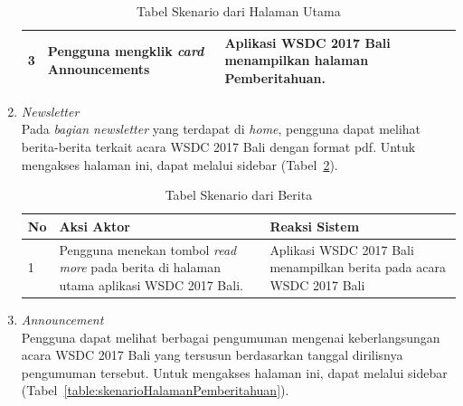 \begin{enumerate}
\begin{table}[H]
\begin{tabular}{|p{0.5cm}|p{7cm}|p{7cm}|}
				3  & Pengguna mengklik {\it card} Announcements & Aplikasi WSDC 2017 Bali menampilkan halaman Pemberitahuan. \\ \hline
			\end{tabular}
			\caption{Tabel Skenario dari Halaman Utama}
			\label{table:skenarioHalamanUtama}
		\end{table}
	\item \textit{Newsletter} \\ 
	Pada \textit{bagian newsletter} yang terdapat di \textit{home}, pengguna dapat melihat berita-berita terkait acara WSDC 2017 Bali dengan format pdf. Untuk mengakses halaman ini, dapat melalui sidebar (Tabel~\ref{table:skenarioBerita}).
		\begin{table}[H]
			\centering
			\begin{tabular}{|p{0.5cm}|p{7cm}|p{7cm}|}
				\hline
				No & Aksi Aktor                               & Reaksi Sistem                                          \\ \hline
				1  & Pengguna menekan tombol {\it read more} pada berita di halaman utama aplikasi WSDC 2017 Bali. & Aplikasi WSDC 2017 Bali menampilkan berita pada acara WSDC 2017 Bali \\ \hline
			\end{tabular}
			\caption{Tabel Skenario dari Berita}
			\label{table:skenarioBerita}
		\end{table}
	\item \textit{Announcement} \\ 
	Pengguna dapat melihat berbagai pengumuman mengenai keberlangsungan acara WSDC 2017 Bali yang tersusun berdasarkan tanggal dirilisnya pengumuman tersebut. Untuk mengakses halaman ini, dapat melalui sidebar (Tabel~\ref{table:skenarioHalamanPemberitahuan}).

\end{enumerate}
